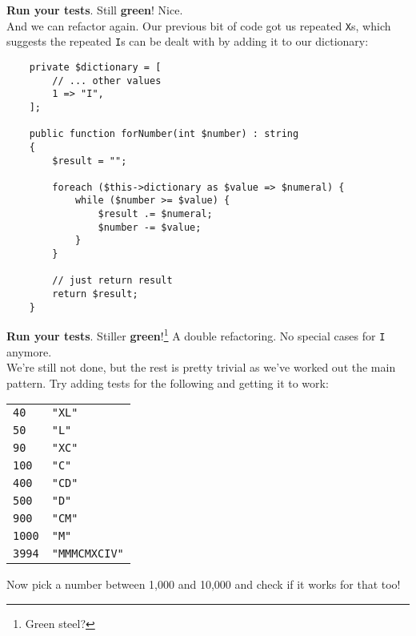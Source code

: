 \textbf{Run your tests}. Still \textbf{green}! Nice.
\\

And we can refactor again. Our previous bit of code got us repeated \texttt{X}s, which suggests the repeated \texttt{I}s can be dealt with by adding it to our dictionary:

\begin{verbatim}
    private $dictionary = [
        // ... other values
        1 => "I",
    ];

    public function forNumber(int $number) : string
    {
        $result = "";

        foreach ($this->dictionary as $value => $numeral) {
            while ($number >= $value) {
                $result .= $numeral;
                $number -= $value;
            }
        }

        // just return result
        return $result;
    }
\end{verbatim}

\textbf{Run your tests}. Stiller \textbf{green}!\footnote{Green steel?} A double refactoring. No special cases for \texttt{I} anymore.
\\

We're still not done, but the rest is pretty trivial as we've worked out the main pattern. Try adding tests for the following and getting it to work:
\\

\begin{small}
    \begin{tabu}{l X}
        \texttt{40} & \texttt{"XL"} \\
        \texttt{50} & \texttt{"L"} \\
        \texttt{90} & \texttt{"XC"} \\
        \texttt{100} & \texttt{"C"} \\
        \texttt{400} & \texttt{"CD"} \\
        \texttt{500} & \texttt{"D"} \\
        \texttt{900} & \texttt{"CM"} \\
        \texttt{1000} & \texttt{"M"} \\
        \texttt{3994} & \texttt{"MMMCMXCIV"} \\
    \end{tabu}
\end{small}

\par\bigskip

Now pick a number between 1,000 and 10,000 and check if it works for that too!
\\

